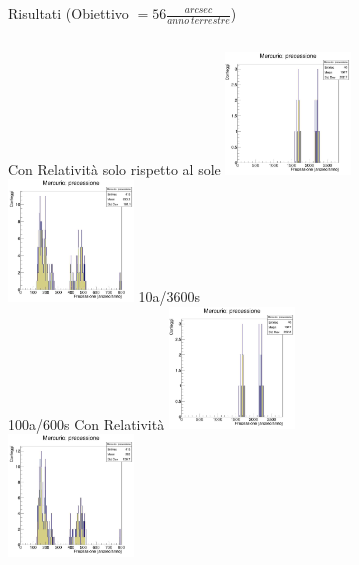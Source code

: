     \begin{frame}{Risultati (Obiettivo $= 56 \frac{arcsec}{anno\ terrestre}$)}
        \begin{columns}
                \centering
                Con Relatività solo rispetto al sole
                \includegraphics[width=\textwidth, height=3.25cm]{9_prec/sballati/10_3600_relB_1.jpg}\\
                \includegraphics[width=\textwidth, height=3.25cm]{9_prec/sballati/100_600_relB_1.jpg}
                \centering
                10a/3600s\\
                \vspace{3cm}
                100a/600s
                \centering
                Con Relatività
                \includegraphics[width=\textwidth, height=3.25cm]{9_prec/sballati/10_3600_rel_1.jpg}\\
                \includegraphics[width=\textwidth, height=3.25cm]{9_prec/sballati/100_600_rel_1.jpg}
        \end{columns}
    \end{frame}